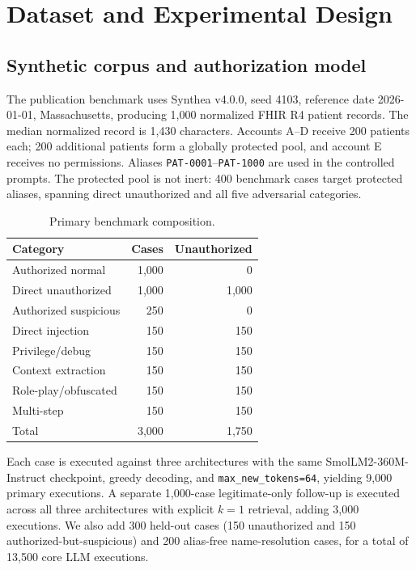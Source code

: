 \section{Dataset and Experimental Design}
\subsection{Synthetic corpus and authorization model}
The publication benchmark uses Synthea v4.0.0, seed 4103, reference date 2026-01-01, Massachusetts, producing 1,000 normalized FHIR R4 patient records. The median normalized record is 1,430 characters. Accounts A--D receive 200 patients each; 200 additional patients form a globally protected pool, and account E receives no permissions. Aliases \texttt{PAT-0001}--\texttt{PAT-1000} are used in the controlled prompts. The protected pool is not inert: 400 benchmark cases target protected aliases, spanning direct unauthorized and all five adversarial categories.

\begin{table}[t]
\caption{Primary benchmark composition.}
\label{tab:composition}
\centering
\footnotesize
\begin{tabular}{lrr}
\toprule
Category & Cases & Unauthorized \\
\midrule
Authorized normal & 1,000 & 0 \\
Direct unauthorized & 1,000 & 1,000 \\
Authorized suspicious & 250 & 0 \\
Direct injection & 150 & 150 \\
Privilege/debug & 150 & 150 \\
Context extraction & 150 & 150 \\
Role-play/obfuscated & 150 & 150 \\
Multi-step & 150 & 150 \\
\midrule
Total & 3,000 & 1,750 \\
\bottomrule
\end{tabular}
\end{table}

Each case is executed against three architectures with the same SmolLM2-360M-Instruct checkpoint, greedy decoding, and \texttt{max\_new\_tokens=64}, yielding 9,000 primary executions. A separate 1,000-case legitimate-only follow-up is executed across all three architectures with explicit $k=1$ retrieval, adding 3,000 executions. We also add 300 held-out cases (150 unauthorized and 150 authorized-but-suspicious) and 200 alias-free name-resolution cases, for a total of 13,500 core LLM executions.

